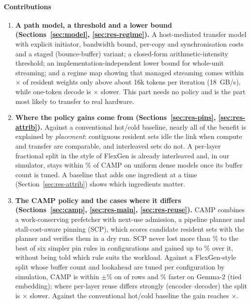 \documentclass[preprint,12pt]{elsarticle}
\newcommand{\camp}{\textsc{CAMP}}
\begin{document}
\paragraph{Contributions}
\begin{enumerate}
\item \textbf{A path model, a threshold and a lower bound (Sections~\ref{sec:model}, \ref{sec:res-regime}).} A host-mediated transfer model with explicit initiator, bandwidth bound, per-copy and synchronisation costs and a staged (bounce-buffer) variant; a closed-form arithmetic-intensity threshold; an implementation-independent lower bound for whole-unit streaming; and a regime map showing that managed streaming comes within \nRegSlowSixteenKEighteen$\times$ of resident weights only above about 16k tokens per iteration (18~GB/s), while one-token decode is \nRegSlowOneEighteen$\times$ slower. This part needs no policy and is the part most likely to transfer to real hardware.
\item \textbf{Where the policy gains come from (Sections~\ref{sec:res-pins}, \ref{sec:res-attrib}).} Against a conventional hot/cold baseline, nearly all of the benefit is explained by \emph{placement}: contiguous resident sets idle the link when compute and transfer are comparable, and interleaved sets do not. A per-layer fractional split in the style of FlexGen is already interleaved and, in our simulator, stays within \nWorstLossExt\% of \camp{} on uniform dense models once its buffer count is tuned. A baseline that adds one ingredient at a time (Section~\ref{sec:res-attrib}) shows which ingredients matter.
\item \textbf{The \camp{} policy and the cases where it differs (Sections~\ref{sec:camp}, \ref{sec:res-main}, \ref{sec:res-reuse}).} \camp{} combines a work-conserving prefetcher with next-use admission, a pipeline planner and stall-cost-aware pinning (SCP), which scores candidate resident sets with the planner and verifies them in a dry run. SCP never lost more than \nScpRegretMaxPct\% to the best of six simpler pin rules in \nPinCfg{} configurations and gained up to \nScpGainOverBestSimpleMax\% over it, without being told which rule suits the workload. Against a FlexGen-style split whose buffer count and lookahead are tuned per configuration by simulation, \camp{} is within $\pm$\nWorstLossExt\% on \nTieExtPlusWins{} of \nMainRows{} rows and \nFgLoseMaxPct\% faster on Gemma-2 (tied embedding); where per-layer reuse differs strongly (encoder--decoder) the split is \nHetEncFg$\times$ slower. Against the conventional hot/cold baseline the gain reaches \nHcOverCampMax$\times$.

\end{enumerate}
\end{document}
